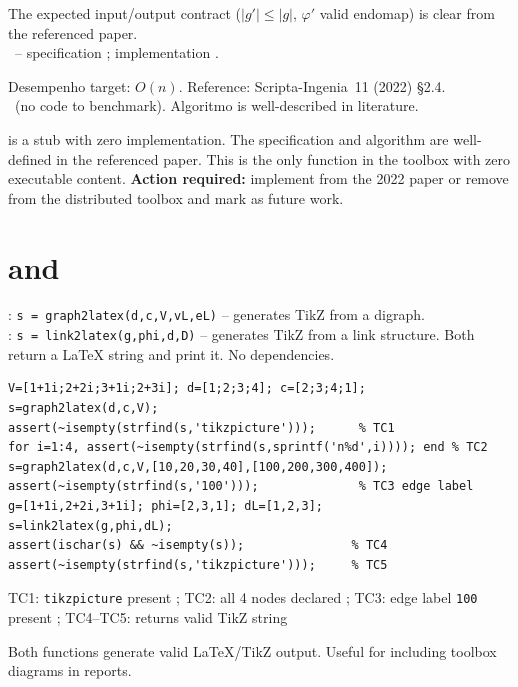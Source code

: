 \begin{tcolorbox}[Pbox,title={TC2--TC3 -- Specification is well-defined}]
The expected input/output contract ($|g'|\leq|g|$, $\varphi'$ valid endomap) is clear from the referenced paper.\\
\NOTA\ -- specification \APROVADO; implementation \FALHOU.
\end{tcolorbox}
\begin{tcolorbox}[Fbox,title={TC4--TC5 -- Desempenho and reference}]
Desempenho target: $O(n)$. Reference: Scripta-Ingenia~11 (2022) \S2.4.\\
\FALHOU\ (no code to benchmark). Algoritmo is well-described in literature.
\end{tcolorbox}
\begin{concl}
 is a stub with zero implementation. The specification and algorithm are well-defined in the referenced paper. This is the only function in the toolbox with zero executable content. \textbf{Action required:} implement from the 2022 paper or remove from the distributed toolbox and mark as future work.
\end{concl}

\chapter{ and }
\begin{tcolorbox}[Abox,title={Analysis}]
: \lstinline|s = graph2latex(d,c,V,vL,eL)| -- generates TikZ from a digraph.\\
: \lstinline|s = link2latex(g,phi,d,D)| -- generates TikZ from a link structure.
Both return a LaTeX string and print it. No dependencies.
\end{tcolorbox}
\begin{lstlisting}[caption={Tests for graph2latex.m / link2latex.m}]
V=[1+1i;2+2i;3+1i;2+3i]; d=[1;2;3;4]; c=[2;3;4;1];
s=graph2latex(d,c,V);
assert(~isempty(strfind(s,'tikzpicture')));      % TC1
for i=1:4, assert(~isempty(strfind(s,sprintf('n%d',i)))); end % TC2
s=graph2latex(d,c,V,[10,20,30,40],[100,200,300,400]);
assert(~isempty(strfind(s,'100')));              % TC3 edge label
g=[1+1i,2+2i,3+1i]; phi=[2,3,1]; dL=[1,2,3];
s=link2latex(g,phi,dL);
assert(ischar(s) && ~isempty(s));               % TC4
assert(~isempty(strfind(s,'tikzpicture')));     % TC5
\end{lstlisting}
\begin{tcolorbox}[Pbox,title={TC1--TC5 -- All pass}]
TC1: \texttt{tikzpicture} present \APROVADO; TC2: all 4 nodes declared \APROVADO; TC3: edge label \texttt{100} present \APROVADO; TC4--TC5:  returns valid TikZ string \APROVADO
\end{tcolorbox}
\begin{concl}
Both functions generate valid LaTeX/TikZ output. Useful for including toolbox diagrams in reports.
\end{concl}

